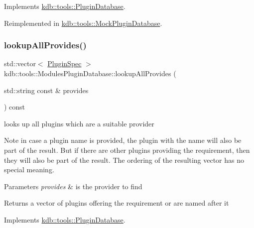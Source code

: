 Implements \mbox{\hyperlink{classkdb_1_1tools_1_1PluginDatabase_adc1f43ccefdd7fc15a57db7571420642}{kdb\+::tools\+::\+Plugin\+Database}}.



Reimplemented in \mbox{\hyperlink{classkdb_1_1tools_1_1MockPluginDatabase_a3663848683953bfad7123c48c00ab404}{kdb\+::tools\+::\+Mock\+Plugin\+Database}}.

\mbox{\label{classkdb_1_1tools_1_1ModulesPluginDatabase_a306384e88f9cf2874f6ba9ce28973a26}} 
\subsubsection{\texorpdfstring{lookupAllProvides()}{lookupAllProvides()}}
{\footnotesize\ttfamily std\+::vector$<$ \mbox{\hyperlink{classkdb_1_1tools_1_1PluginSpec}{Plugin\+Spec}} $>$ kdb\+::tools\+::\+Modules\+Plugin\+Database\+::lookup\+All\+Provides (\begin{DoxyParamCaption}\item[{std\+::string const \&}]{provides }\end{DoxyParamCaption}) const\hspace{0.3cm}{\ttfamily [virtual]}}



looks up all plugins which are a suitable provider 

\begin{DoxyNote}{Note}
in case a plugin name is provided, the plugin with the name will also be part of the result. But if there are other plugins providing the requirement, then they will also be part of the result. The ordering of the resulting vector has no special meaning.
\end{DoxyNote}

\begin{DoxyParams}{Parameters}
{\em provides} & is the provider to find\\
\hline
\end{DoxyParams}
\begin{DoxyReturn}{Returns}
a vector of plugins offering the requirement or are named after it 
\end{DoxyReturn}


Implements \mbox{\hyperlink{classkdb_1_1tools_1_1PluginDatabase_a3ed261ad8562c423b64cf34cbc086161}{kdb\+::tools\+::\+Plugin\+Database}}.

